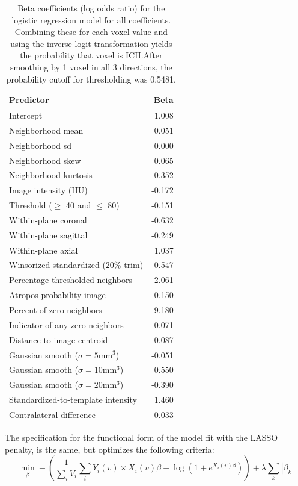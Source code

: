 \documentclass{elsarticle_nonatbib}\usepackage[]{graphicx}\usepackage[]{color}
\begin{document}
\begin{table}[ht]
\centering
\begin{tabular}{lr}
  \hline
Predictor & Beta \\ 
  \hline
Intercept & 1.008 \\ 
  Neighborhood mean & 0.051 \\ 
  Neighborhood sd & 0.000 \\ 
  Neighborhood skew & 0.065 \\ 
  Neighborhood kurtosis & -0.352 \\ 
  Image intensity (HU) & -0.172 \\ 
  Threshold ($\geq$ 40 and $\leq$ 80) & -0.151 \\ 
  Within-plane coronal & -0.632 \\ 
  Within-plane sagittal & -0.249 \\ 
  Within-plane axial & 1.037 \\ 
  Winsorized standardized (20\% trim) & 0.547 \\ 
  Percentage thresholded neighbors & 2.061 \\ 
  Atropos probability image & 0.150 \\ 
  Percent of zero neighbors & -9.180 \\ 
  Indicator of any zero neighbors & 0.071 \\ 
  Distance to image centroid & -0.087 \\ 
  Gaussian smooth ($\sigma = 5$mm$^3$) & -0.051 \\ 
  Gaussian smooth ($\sigma = 10$mm$^3$) & 0.550 \\ 
  Gaussian smooth ($\sigma = 20$mm$^3$) & -0.390 \\ 
  Standardized-to-template intensity & 1.460 \\ 
  Contralateral difference & 0.033 \\ 
   \hline
\end{tabular}
\caption{Beta coefficients (log odds ratio) for the logistic regression model for all coefficients.  Combining these for each voxel value and using the inverse logit transformation yields the probability that voxel is ICH.After smoothing by 1 voxel in all 3 directions, the probability cutoff for thresholding was 0.5481.} 
\label{tab:modspec}
\end{table}


The specification for the functional form of the model fit with the LASSO penalty, is the same, but optimizes the following criteria:
$$
\min_{\beta} - \left( \frac{1}{\sum_{i}V_i} \sum_i Y_{i}(v) \times X_i(v)\beta - \log \left(1 + e^{X_i(v)\beta}\right) \right) +\lambda\sum_{k}\left|\beta_k\right|
$$
\end{document}
